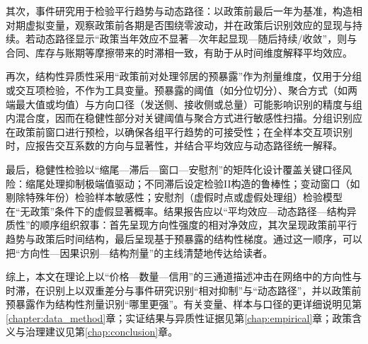 其次，事件研究用于检验平行趋势与动态路径：以政策前最后一年为基准，构造相对期虚拟变量，观察政策前各期是否围绕零波动，并在政策后识别效应的显现与持续。若动态路径显示“政策当年效应不显著—次年起显现—随后持续/收敛”，则与合同、库存与账期等摩擦带来的时滞相一致，有助于从时间维度解释平均效应。

再次，结构性异质性采用“政策前对处理邻居的预暴露”作为剂量维度，仅用于分组或交互项检验，不作为工具变量。预暴露的阈值（如分位切分）、聚合方式（如两端最大值或均值）与方向口径（发送侧、接收侧或总量）可能影响识别的精度与组内混合度，因而在稳健性部分对关键阈值与聚合方式进行敏感性扫描。分组识别应在政策前窗口进行预检，以确保各组平行趋势的可接受性；在全样本交互项识别时，应报告交互系数的方向与显著性，并结合平均效应与动态路径统一解释。

最后，稳健性检验以“缩尾—滞后—窗口—安慰剂”的矩阵化设计覆盖关键口径风险：缩尾处理抑制极端值驱动；不同滞后设定检验II构造的鲁棒性；变动窗口（如剔除特殊年份）检验样本敏感性；安慰剂（虚假时点或虚假处理组）检验模型在“无政策”条件下的虚假显著概率。结果报告应以“平均效应—动态路径—结构异质性”的顺序组织叙事：首先呈现方向性强度的相对净效应，其次呈现政策前平行趋势与政策后时间结构，最后呈现基于预暴露的结构性梯度。通过这一顺序，可以把“方向性—因果识别—结构剂量”的主线清楚地传达给读者。

综上，本文在理论上以“价格—数量—信用”的三通道描述冲击在网络中的方向性与时滞，在识别上以双重差分与事件研究识别“相对抑制”与“动态路径”，并以政策前预暴露作为结构性剂量识别“哪里更强”。有关变量、样本与口径的更详细说明见第\ref{chapter:data_method}章；实证结果与异质性证据见第\ref{chap:empirical}章；政策含义与治理建议见第\ref{chap:conclusion}章。